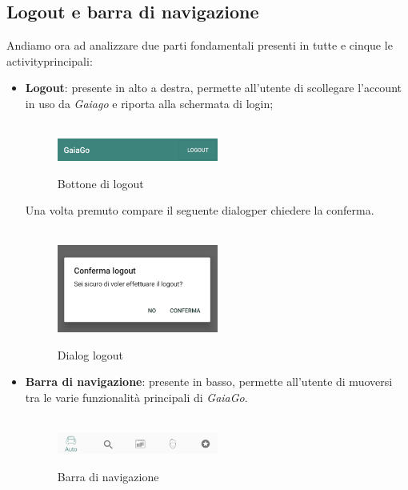 \subsection{Logout e barra di navigazione}
Andiamo ora ad analizzare due parti fondamentali presenti in tutte e cinque le activity\glosp principali:
\begin{itemize}
	\item \textbf{Logout}: presente in alto a destra, permette all'utente di scollegare l'account in uso da \textit{Gaiago} e riporta alla schermata di login;
	\\\\
	  \begin{figure}[H] 
	 	\centering 
	 	\includegraphics[width=0.5\textwidth]{res/images/logout.png}\\
	 	\caption{Bottone di logout}
	 	\label{Login button}
	 \end{figure}
 Una volta premuto compare il seguente dialog\glosp per chiedere la conferma.
 \\\\
 \begin{figure}[H] 
 	\centering 
 	\includegraphics[width=0.5\textwidth]{res/images/logout_press.png}\\
 	\caption{Dialog logout}
 	\label{Logout_press}
 \end{figure}
 	\item  \textbf{Barra di navigazione}: presente in basso, permette all'utente di muoversi tra le varie funzionalità principali di \textit{GaiaGo}.
 	\\\\
 	  \begin{figure}[H] 
 	  	\centering 
 	  	\includegraphics[width=0.5\textwidth]{res/images/barra_navigazione.png}\\
 	  	\caption{Barra di navigazione}
 	  	\label{Barra di navigazione}
 	  \end{figure}
\end{itemize}
\pagebreak
